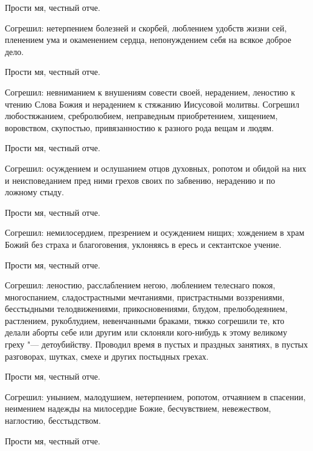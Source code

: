 Прости мя, честный отче. 



Согрешил: нетерпением болезней и скорбей, люблением удобств жизни сей, пленением ума и окаменением сердца, непонуждением себя на всякое доброе дело. 



Прости мя, честный отче. 



Согрешил: невниманием к внушениям совести своей, нерадением, леностию к чтению Слова Божия и нерадением к стяжанию Иисусовой молитвы. Согрешил любостяжанием, сребролюбием, неправедным приобретением, хищением, воровством, скупостью, привязанностию к разного рода вещам и людям. 



Прости мя, честный отче. 



Согрешил: осуждением и ослушанием отцов духовных, ропотом и обидой на них и неисповеданием пред ними грехов своих по забвению, нерадению и по ложному стыду. 



Прости мя, честный отче. 



Согрешил: немилосердием, презрением и осуждением нищих; хождением в храм Божий без страха и благоговения, уклоняясь в ересь и сектантское учение. 



Прости мя, честный отче. 



Согрешил: леностию, расслаблением негою, люблением телеснаго покоя, многоспанием, сладострастными мечтаниями, пристрастными воззрениями, бесстыдными телодвижениями, прикосновениями, блудом, прелюбодеянием, растлением, рукоблудием, невенчанными браками, тяжко согрешили те, кто делали аборты себе или другим или склоняли кого-нибудь к этому великому греху "--- детоубийству. Проводил время в пустых и праздных занятиях, в пустых разговорах, шутках, смехе и других постыдных грехах. 



Прости мя, честный отче. 



Согрешил: унынием, малодушием, нетерпением, ропотом, отчаянием в спасении, неимением надежды на милосердие Божие, бесчувствием, невежеством, наглостию, бесстыдством. 



Прости мя, честный отче. 



